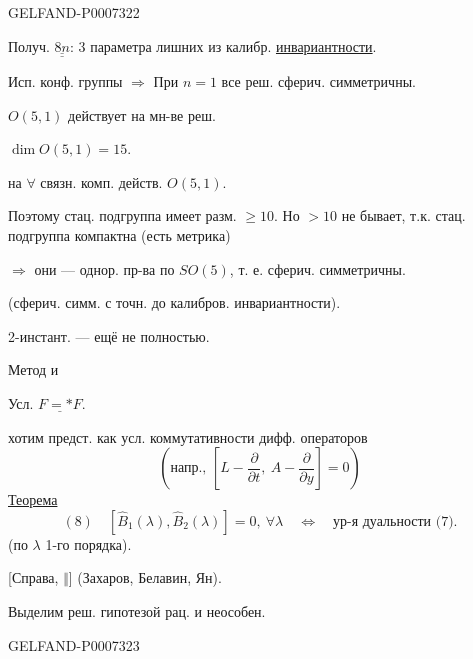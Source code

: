 \begin{GelfandAdjacentEvidence}{GELFAND-P000732}{2}


Получ. \(\underline{\underline{8n}}\): 3 параметра лишних из калибр. \underline{инвариантности}.

Исп. конф. группы \(\Rightarrow\) При \(n=1\) все реш. сферич. симметричны.

\(O(5,1)\) действует на мн-ве реш.

\qquad [Справа:] \(\dim O(5,1)=15\).

на \(\forall\) связн. комп. действ. \(O(5,1)\).

Поэтому стац. подгруппа имеет разм. \(\geq10\). Но \(>10\) не бывает, т.к. стац. подгруппа компактна (есть метрика)

\(\Rightarrow\) они --- однор. пр-ва по \(SO(5)\), т. е. сферич. симметричны.

(сферич. симм. с точн. до калибров. инвариантности).

2-инстант. --- ещё не полностью.

Метод  и 

Усл. \(\underline{F={*}F}\).

хотим предст. как усл. коммутативности дифф. операторов
\[
\left(\text{напр., }\left[L-\frac{\partial}{\partial t},\
 A-\frac{\partial}{\partial y}\right]=0\right)
\]
\underline{Теорема}
\[
(8)\quad [\widehat B_1(\lambda),\widehat B_2(\lambda)]=0,\ \forall\lambda
\quad\Longleftrightarrow\quad\text{ур-я дуальности (7)}.
\]
(по \(\lambda\) 1-го порядка).

[Справа, \(\Vert\)] (Захаров, Белавин, Ян).

Выделим реш. гипотезой рац. и неособен.
\end{GelfandAdjacentEvidence}
\begin{GelfandAdjacentEvidence}{GELFAND-P000732}{3}

\end{GelfandAdjacentEvidence}
